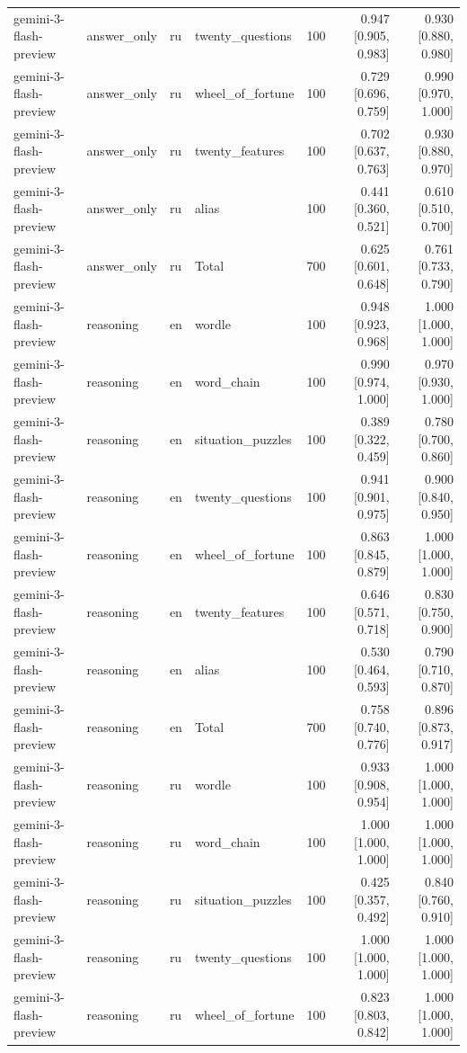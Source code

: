 \begin{longtable}{llllrrr}
gemini-3-flash-preview & answer\_only & ru & twenty\_questions & 100 & 0.947 [0.905, 0.983] & 0.930 [0.880, 0.980] \\
gemini-3-flash-preview & answer\_only & ru & wheel\_of\_fortune & 100 & 0.729 [0.696, 0.759] & 0.990 [0.970, 1.000] \\
gemini-3-flash-preview & answer\_only & ru & twenty\_features & 100 & 0.702 [0.637, 0.763] & 0.930 [0.880, 0.970] \\
gemini-3-flash-preview & answer\_only & ru & alias & 100 & 0.441 [0.360, 0.521] & 0.610 [0.510, 0.700] \\
gemini-3-flash-preview & answer\_only & ru & Total & 700 & 0.625 [0.601, 0.648] & 0.761 [0.733, 0.790] \\
gemini-3-flash-preview & reasoning & en & wordle & 100 & 0.948 [0.923, 0.968] & 1.000 [1.000, 1.000] \\
gemini-3-flash-preview & reasoning & en & word\_chain & 100 & 0.990 [0.974, 1.000] & 0.970 [0.930, 1.000] \\
gemini-3-flash-preview & reasoning & en & situation\_puzzles & 100 & 0.389 [0.322, 0.459] & 0.780 [0.700, 0.860] \\
gemini-3-flash-preview & reasoning & en & twenty\_questions & 100 & 0.941 [0.901, 0.975] & 0.900 [0.840, 0.950] \\
gemini-3-flash-preview & reasoning & en & wheel\_of\_fortune & 100 & 0.863 [0.845, 0.879] & 1.000 [1.000, 1.000] \\
gemini-3-flash-preview & reasoning & en & twenty\_features & 100 & 0.646 [0.571, 0.718] & 0.830 [0.750, 0.900] \\
gemini-3-flash-preview & reasoning & en & alias & 100 & 0.530 [0.464, 0.593] & 0.790 [0.710, 0.870] \\
gemini-3-flash-preview & reasoning & en & Total & 700 & 0.758 [0.740, 0.776] & 0.896 [0.873, 0.917] \\
gemini-3-flash-preview & reasoning & ru & wordle & 100 & 0.933 [0.908, 0.954] & 1.000 [1.000, 1.000] \\
gemini-3-flash-preview & reasoning & ru & word\_chain & 100 & 1.000 [1.000, 1.000] & 1.000 [1.000, 1.000] \\
gemini-3-flash-preview & reasoning & ru & situation\_puzzles & 100 & 0.425 [0.357, 0.492] & 0.840 [0.760, 0.910] \\
gemini-3-flash-preview & reasoning & ru & twenty\_questions & 100 & 1.000 [1.000, 1.000] & 1.000 [1.000, 1.000] \\
gemini-3-flash-preview & reasoning & ru & wheel\_of\_fortune & 100 & 0.823 [0.803, 0.842] & 1.000 [1.000, 1.000] \\

\end{longtable}
